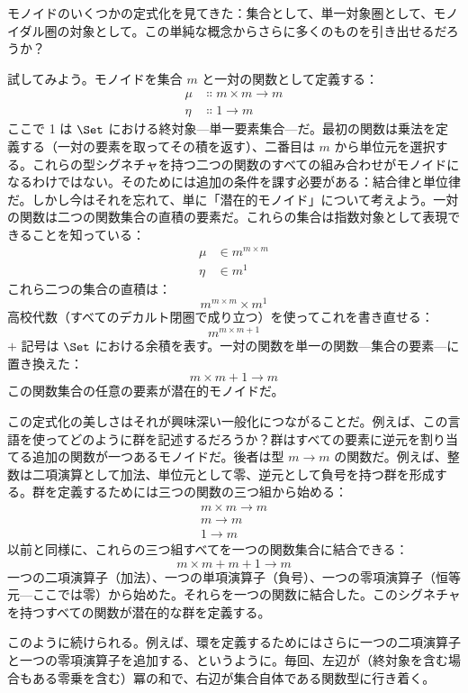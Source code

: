 
\lettrine[lhang=0.17]{モ}{ノイドのいくつかの定式化を見てきた}：集合として、単一対象圏として、モノイダル圏の対象として。この単純な概念からさらに多くのものを引き出せるだろうか？

試してみよう。モノイドを集合 $m$ と一対の関数として定義する：
\begin{align*}
  \mu  & \Colon m\times{}m \to m \\
  \eta & \Colon 1 \to m
\end{align*}
ここで 1 は $\Set$ における終対象—単一要素集合—だ。最初の関数は乗法を定義する（一対の要素を取ってその積を返す）、二番目は $m$ から単位元を選択する。これらの型シグネチャを持つ二つの関数のすべての組み合わせがモノイドになるわけではない。そのためには追加の条件を課す必要がある：結合律と単位律だ。しかし今はそれを忘れて、単に「潜在的モノイド」について考えよう。一対の関数は二つの関数集合の直積の要素だ。これらの集合は指数対象として表現できることを知っている：
\begin{align*}
  \mu  & \in m^{m\times{}m} \\
  \eta & \in m^1
\end{align*}
これら二つの集合の直積は：
\[m^{m\times{}m}\times{}m^1\]
高校代数（すべてのデカルト閉圏で成り立つ）を使ってこれを書き直せる：
\[m^{m\times{}m + 1}\]
$+$ 記号は $\Set$ における余積を表す。一対の関数を単一の関数—集合の要素—に置き換えた：
\[m\times{}m + 1 \to m\]
この関数集合の任意の要素が潜在的モノイドだ。

この定式化の美しさはそれが興味深い一般化につながることだ。例えば、この言語を使ってどのように群を記述するだろうか？群はすべての要素に逆元を割り当てる追加の関数が一つあるモノイドだ。後者は型 $m \to m$ の関数だ。例えば、整数は二項演算として加法、単位元として零、逆元として負号を持つ群を形成する。群を定義するためには三つの関数の三つ組から始める：
\begin{align*}
  m\times{}m \to m \\
  m \to m          \\
  1 \to m
\end{align*}
以前と同様に、これらの三つ組すべてを一つの関数集合に結合できる：
\[m\times{}m + m + 1 \to m\]
一つの二項演算子（加法）、一つの単項演算子（負号）、一つの零項演算子（恒等元—ここでは零）から始めた。それらを一つの関数に結合した。このシグネチャを持つすべての関数が潜在的な群を定義する。

このように続けられる。例えば、環を定義するためにはさらに一つの二項演算子と一つの零項演算子を追加する、というように。毎回、左辺が（終対象を含む場合もある零乗を含む）冪の和で、右辺が集合自体である関数型に行き着く。

